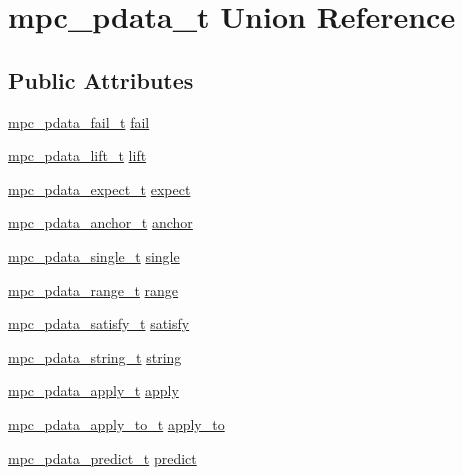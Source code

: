 \hypertarget{unionmpc__pdata__t}{}\section{mpc\+\_\+pdata\+\_\+t Union Reference}
\label{unionmpc__pdata__t}
\subsection*{Public Attributes}
\begin{DoxyCompactItemize}
\item 
\hyperlink{structmpc__pdata__fail__t}{mpc\+\_\+pdata\+\_\+fail\+\_\+t} \hyperlink{unionmpc__pdata__t_a8de2419f97147bac5548f42dbd33ff42}{fail}
\item 
\hyperlink{structmpc__pdata__lift__t}{mpc\+\_\+pdata\+\_\+lift\+\_\+t} \hyperlink{unionmpc__pdata__t_a3d2399ac936e5167bef64c5ed29f4906}{lift}
\item 
\hyperlink{structmpc__pdata__expect__t}{mpc\+\_\+pdata\+\_\+expect\+\_\+t} \hyperlink{unionmpc__pdata__t_ab39a59366837f6fa5f6bfc8d449a922f}{expect}
\item 
\hyperlink{structmpc__pdata__anchor__t}{mpc\+\_\+pdata\+\_\+anchor\+\_\+t} \hyperlink{unionmpc__pdata__t_ae224a8e37941b33eb21986baad3939aa}{anchor}
\item 
\hyperlink{structmpc__pdata__single__t}{mpc\+\_\+pdata\+\_\+single\+\_\+t} \hyperlink{unionmpc__pdata__t_a948bac6a5531683d547ad6d07de195d2}{single}
\item 
\hyperlink{structmpc__pdata__range__t}{mpc\+\_\+pdata\+\_\+range\+\_\+t} \hyperlink{unionmpc__pdata__t_a8623b62ec5cf8e55747d8e7ea0adbb95}{range}
\item 
\hyperlink{structmpc__pdata__satisfy__t}{mpc\+\_\+pdata\+\_\+satisfy\+\_\+t} \hyperlink{unionmpc__pdata__t_ad25ea957705845f2cde5acd6eb414c0f}{satisfy}
\item 
\hyperlink{structmpc__pdata__string__t}{mpc\+\_\+pdata\+\_\+string\+\_\+t} \hyperlink{unionmpc__pdata__t_a8a6e92a40456201ce239083f5ba988e0}{string}
\item 
\hyperlink{structmpc__pdata__apply__t}{mpc\+\_\+pdata\+\_\+apply\+\_\+t} \hyperlink{unionmpc__pdata__t_a7b98c42433fe2196bbc7ac11286638d1}{apply}
\item 
\hyperlink{structmpc__pdata__apply__to__t}{mpc\+\_\+pdata\+\_\+apply\+\_\+to\+\_\+t} \hyperlink{unionmpc__pdata__t_a643003accb3a7fa3fd82500672e57792}{apply\+\_\+to}
\item 
\hyperlink{structmpc__pdata__predict__t}{mpc\+\_\+pdata\+\_\+predict\+\_\+t} \hyperlink{unionmpc__pdata__t_a8f2727e53585d86269efa71e605a394c}{predict}

\end{DoxyCompactItemize}

